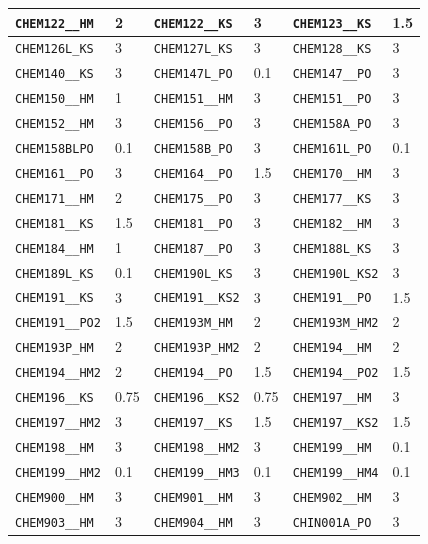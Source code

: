 \begin{longtable}{|l|l||l|l||l|l|}
    \verb|CHEM122__HM| & 2 & \verb|CHEM122__KS| & 3 & \verb|CHEM123__KS| & 1.5\\\hline
    \verb|CHEM126L_KS| & 3 & \verb|CHEM127L_KS| & 3 & \verb|CHEM128__KS| & 3\\\hline
    \verb|CHEM140__KS| & 3 & \verb|CHEM147L_PO| & 0.1 & \verb|CHEM147__PO| & 3\\\hline
    \verb|CHEM150__HM| & 1 & \verb|CHEM151__HM| & 3 & \verb|CHEM151__PO| & 3\\\hline
    \verb|CHEM152__HM| & 3 & \verb|CHEM156__PO| & 3 & \verb|CHEM158A_PO| & 3\\\hline
    \verb|CHEM158BLPO| & 0.1 & \verb|CHEM158B_PO| & 3 & \verb|CHEM161L_PO| & 0.1\\\hline
    \verb|CHEM161__PO| & 3 & \verb|CHEM164__PO| & 1.5 & \verb|CHEM170__HM| & 3\\\hline
    \verb|CHEM171__HM| & 2 & \verb|CHEM175__PO| & 3 & \verb|CHEM177__KS| & 3\\\hline
    \verb|CHEM181__KS| & 1.5 & \verb|CHEM181__PO| & 3 & \verb|CHEM182__HM| & 3\\\hline
    \verb|CHEM184__HM| & 1 & \verb|CHEM187__PO| & 3 & \verb|CHEM188L_KS| & 3\\\hline
    \verb|CHEM189L_KS| & 0.1 & \verb|CHEM190L_KS| & 3 & \verb|CHEM190L_KS2| & 3\\\hline
    \verb|CHEM191__KS| & 3 & \verb|CHEM191__KS2| & 3 & \verb|CHEM191__PO| & 1.5\\\hline
    \verb|CHEM191__PO2| & 1.5 & \verb|CHEM193M_HM| & 2 & \verb|CHEM193M_HM2| & 2\\\hline
    \verb|CHEM193P_HM| & 2 & \verb|CHEM193P_HM2| & 2 & \verb|CHEM194__HM| & 2\\\hline
    \verb|CHEM194__HM2| & 2 & \verb|CHEM194__PO| & 1.5 & \verb|CHEM194__PO2| & 1.5\\\hline
    \verb|CHEM196__KS| & 0.75 & \verb|CHEM196__KS2| & 0.75 & \verb|CHEM197__HM| & 3\\\hline
    \verb|CHEM197__HM2| & 3 & \verb|CHEM197__KS| & 1.5 & \verb|CHEM197__KS2| & 1.5\\\hline
    \verb|CHEM198__HM| & 3 & \verb|CHEM198__HM2| & 3 & \verb|CHEM199__HM| & 0.1\\\hline
    \verb|CHEM199__HM2| & 0.1 & \verb|CHEM199__HM3| & 0.1 & \verb|CHEM199__HM4| & 0.1\\\hline
    \verb|CHEM900__HM| & 3 & \verb|CHEM901__HM| & 3 & \verb|CHEM902__HM| & 3\\\hline
    \verb|CHEM903__HM| & 3 & \verb|CHEM904__HM| & 3 & \verb|CHIN001A_PO| & 3\\\hline

\end{longtable}
